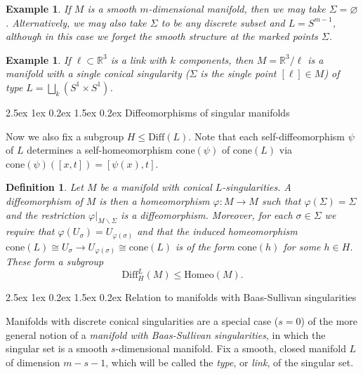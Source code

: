 \documentclass[reqno,a4paper]{article}
\makeatletter
\numberwithin{equation}{section}
\theoremstyle{italicised}
\theoremstyle{upright}
\newtheorem{defn}[thm]{Definition}
\newtheorem{eg}[thm]{Example}
\theoremstyle{italicised-restate}
\renewcommand*{\subsection}{\@startsection{subsection}{2}{\z@}%
	{2.5ex \@plus 1ex \@minus 0.2ex}%
	{1.5ex \@plus 0.2ex}%
	{\normalfont\normalsize\bfseries}}
\newcommand{\bR}{\mathbb{R}}
\renewcommand{\leq}{\leqslant}
\makeatother
\begin{document}
\begin{eg}
If $M$ is a smooth $m$-dimensional manifold, then we may take $\Sigma = \varnothing$. Alternatively, we may also take $\Sigma$ to be any discrete subset and $L = S^{m-1}$, although in this case we forget the smooth structure at the marked points $\Sigma$.
\end{eg}

\begin{eg}
If $\ell \subset \bR^3$ is a link with $k$ components, then $M = \bR^3 / \ell$ is a manifold with a single conical singularity ($\Sigma$ is the single point $[\ell] \in M$) of type $L = \bigsqcup_k (S^1 \times S^1)$.
\end{eg}


\subsection{Diffeomorphisms of singular manifolds}\label{ss:diff-singular}


Now we also fix a subgroup $H \leq \mathrm{Diff}(L)$. Note that each self-diffeomorphism $\psi$ of $L$ determines a self-homeomorphism $\mathrm{cone}(\psi)$ of $\mathrm{cone}(L)$ via $\mathrm{cone}(\psi)([x,t]) = [\psi(x),t]$.

\begin{defn}\label{d:diff-manifold-with-conical-sing}
Let $M$ be a manifold with conical $L$-singularities. A \emph{diffeomorphism} of $M$ is then a homeomorphism $\varphi \colon M \to M$ such that $\varphi(\Sigma) = \Sigma$ and the restriction $\varphi|_{M \smallsetminus \Sigma}$ is a diffeomorphism. Moreover, for each $\sigma \in \Sigma$ we require that $\varphi(U_\sigma) = U_{\varphi(\sigma)}$ and that the induced homeomorphism $\mathrm{cone}(L) \cong U_\sigma \to U_{\varphi(\sigma)} \cong \mathrm{cone}(L)$ is of the form $\mathrm{cone}(h)$ for some $h \in H$. These form a subgroup
\[
\mathrm{Diff}^L_H(M) \leq \mathrm{Homeo}(M).
\]
\end{defn}


\subsection{Relation to manifolds with Baas-Sullivan singularities}\label{ss:BS-singularities}


Manifolds with discrete conical singularities are a special case ($s=0$) of the more general notion of a \emph{manifold with Baas-Sullivan singularities}, in which the singular set is a smooth $s$-dimensional manifold. Fix a smooth, closed manifold $L$ of dimension $m-s-1$, which will be called the \emph{type}, or \emph{link}, of the singular set.
\end{document}
